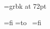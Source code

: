 \nopagenumbers

%
%

\font\foo=grbk at 72pt

=\hbox{\foo f{}i}
=\hbox{\vbox to }
=\hbox{\foo fi}

\hbox{}

\bye

